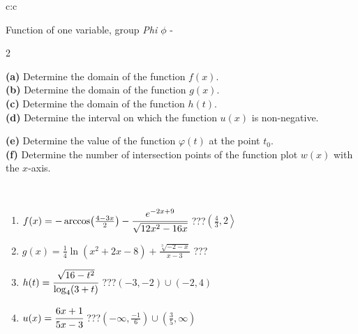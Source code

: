 \documentclass[10pt]{report}
\begin{document}
\begin{tabular}{c:c}
\begin{minipage}[c][104.5mm][t]{0.5\linewidth}
\begin{center}
\vspace{7mm}
{\huge Function of one variable, group \textit{Phi $\phi$} -}\\[5mm]
\begin{minipage}{0.95\linewidth}
\begin{center}
{\small \begin{multicols}{2} \raggedright
\textbf{(a)} Determine the domain of the function \(f(x)\). \\[1mm]
\textbf{(b)} Determine the domain of the function \(g(x)\). \\[1mm]
\textbf{(c)} Determine the domain of the function \(h(t)\). \\[1mm]
\textbf{(d)} Determine the interval on which the function \(u(x)\) is non-negative. \par \columnbreak
\textbf{(e)} Determine the value of the function \(\varphi(t)\) at the point \(t_0\). \\[1mm]
\textbf{(f)} Determine the number of intersection points of the function plot \(w(x)\) with the \(x\)-axis. \\[1mm]
\end{multicols}
}
\end{center}
\end{minipage}
\\[4mm]
\begin{minipage}{0.79\linewidth}
\begin{center}
\begin{varwidth}{\linewidth}
\begin{enumerate}
\small
\item $f(x) = -\arccos\!\left( \frac{4-3x}{2} \right) - \cfrac{e^{-2x+9}}{\sqrt{12x^2-16x}}$\quad \dotfill\; ???\;\dotfill \quad $\left(\frac{4}{3} , 2\right\rangle$
\item $g(x) = \frac{1}{4} \ln{\!(x^2+2x-8)}+\frac{\sqrt[3]{-2-x}}{x-3}$\quad \dotfill\; ???\;\dotfill {}
\item $h(t) = \cfrac{\sqrt{16-t^2}}{\log_4(3+t)}$\quad \dotfill\; ???\;\dotfill \quad $\left(-3 , -2\right)\cup\left(-2 , 4\right)$
\item $u(x) = \cfrac{6x+1}{5x-3}$\quad \dotfill\; ???\;\dotfill \quad $\left(-\infty , \frac{-1}{6}\right)\cup\left(\frac{3}{5} , \infty\right)$

\end{enumerate}
\end{varwidth}
\end{center}
\end{minipage}
\end{center}
\end{minipage}
\end{tabular}
\end{document}
